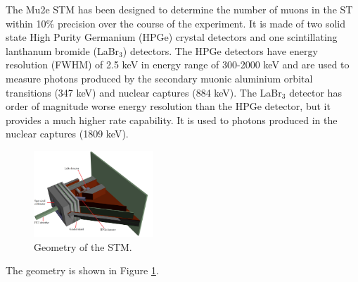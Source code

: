     The Mu2e STM has been designed to determine the number of 
    muons in the ST within 10\% precision over the course of the experiment.  
    It is made of two solid state High Purity Germanium (HPGe) crystal detectors and one 
    scintillating lanthanum bromide (LaBr$_3$) detectors. The HPGe detectors have  
    energy resolution (FWHM) of 2.5 keV in  energy range of 300-2000 keV and are used 
    to measure photons produced by the secondary muonic aluminium orbital transitions 
    (347 keV) and nuclear captures (884 keV). The LaBr$_3$ detector has  order of 
    magnitude worse energy resolution than the HPGe detector, but it provides a much 
    higher rate capability. It is used to  photons produced
    in the nuclear captures (1809 keV).  
    \begin{figure}[!h]
        \centering
        \includegraphics[width =0.4\textwidth]{figures/png/Setup.png}
        \caption[The geometry of the Stopping Target Monitor.]{Geometry of the STM.}
        \label{fig:stmfigure}
        \end{figure}
The  geometry is shown in Figure \ref{fig:stmfigure}.




